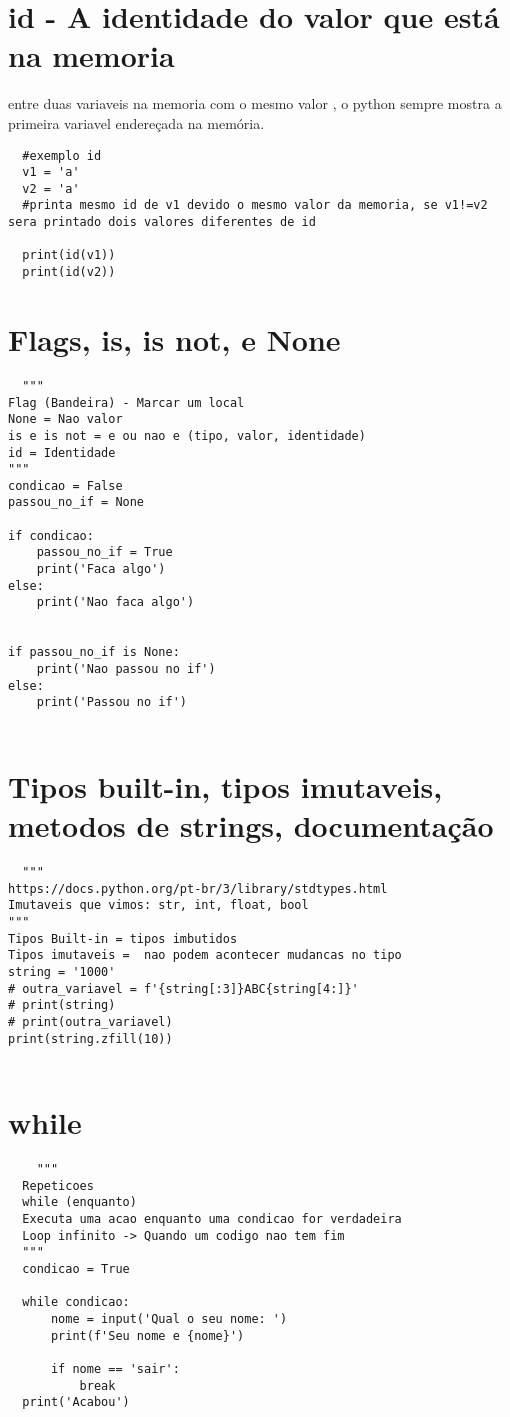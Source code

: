 \documentclass{article}
\begin{document}
\section{id - A identidade do valor que está na memoria}
entre duas variaveis na memoria com o mesmo valor , o python sempre mostra a primeira variavel endereçada na  memória.
\begin{lstlisting}
  #exemplo id
  v1 = 'a'
  v2 = 'a'
  #printa mesmo id de v1 devido o mesmo valor da memoria, se v1!=v2 sera printado dois valores diferentes de id 

  print(id(v1))
  print(id(v2))

\end{lstlisting}
\section{Flags, is, is not, e None}
\begin{lstlisting}
  """
Flag (Bandeira) - Marcar um local
None = Nao valor
is e is not = e ou nao e (tipo, valor, identidade)
id = Identidade
"""
condicao = False
passou_no_if = None

if condicao:
    passou_no_if = True
    print('Faca algo')
else:
    print('Nao faca algo')


if passou_no_if is None:
    print('Nao passou no if')
else:
    print('Passou no if')
  
\end{lstlisting}
\section{Tipos built-in, tipos imutaveis, metodos de strings, documentação}
\begin{lstlisting}
  """
https://docs.python.org/pt-br/3/library/stdtypes.html
Imutaveis que vimos: str, int, float, bool
"""
Tipos Built-in = tipos imbutidos
Tipos imutaveis =  nao podem acontecer mudancas no tipo
string = '1000'
# outra_variavel = f'{string[:3]}ABC{string[4:]}'
# print(string)
# print(outra_variavel)
print(string.zfill(10))
  
\end{lstlisting}
\section{while}
  \begin{lstlisting}
    """
  Repeticoes
  while (enquanto)
  Executa uma acao enquanto uma condicao for verdadeira
  Loop infinito -> Quando um codigo nao tem fim
  """
  condicao = True

  while condicao:
      nome = input('Qual o seu nome: ')
      print(f'Seu nome e {nome}')

      if nome == 'sair':
          break
  print('Acabou')
  \end{lstlisting}
\end{document}
